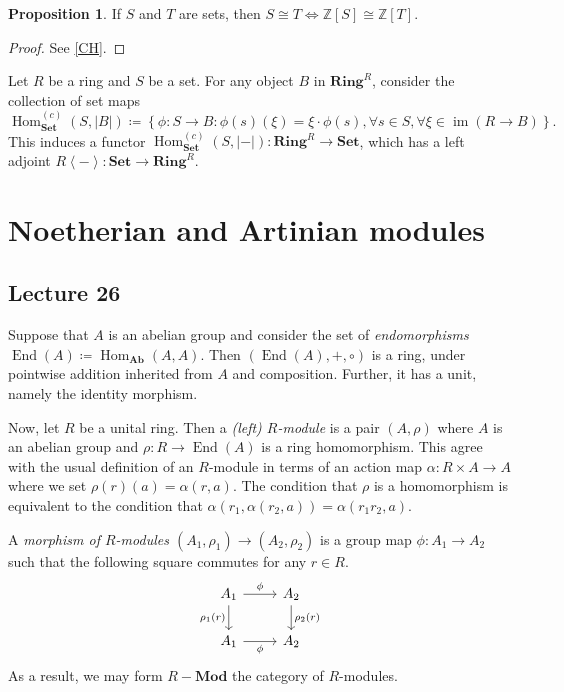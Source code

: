 \documentclass[10pt,letterpaper,cm]{nupset}
\theoremstyle{definition}
\theoremstyle{theorem}
\newtheorem{prop}[definition]{Proposition}
\theoremstyle{remark}
\newcommand{\Z}{\mathbb Z}
\newcommand{\1}{\mathbf{1}}
\newcommand{\0}{\vec 0}
\DeclareMathOperator{\ed}{End}
\DeclareMathOperator{\Hom}{Hom}
\begin{document}
\medskip

\begin{prop}
If $S$ and $T$ are sets, then $S\cong T \iff \Z\left[S\right]\cong \Z\left[T\right]$.
\end{prop}
\begin{proof}
See \cref{CH}.
\end{proof}

\bigskip

Let $R$ be a ring and $S$ be a set. For any object $B$ in $\mathbf{Ring}^R$, consider the collection of set maps
\[
\operatorname{Hom}_{\mathbf{Set}}^{(c)}(S,\left\lvert{B}\right\rvert)\coloneqq \left\{\phi: S \rightarrow B: \phi(s)(\xi)=\xi \cdot \phi(s), \forall{s} \in S, \forall{\xi} \in \operatorname{im}(R \rightarrow B)\right\}. 
\]
This induces a functor $\operatorname{Hom}_{\mathbf{Set}}^{(c)}(S,\left\lvert{-}\right\rvert) : \mathbf{Ring}^R \to \mathbf{Set}$, which has a left adjoint $R\left\langle{-}\right\rangle : \mathbf{Set} \to \mathbf{Ring}^R$.


\section{Noetherian and Artinian modules}

\subsection{Lecture 26}


Suppose that $A$ is an abelian group and consider the set of \textit{endomorphisms} $\ed(A) \coloneqq \Hom_{\mathbf{Ab}}(A, A)$. Then $\left(\ed(A), +, \circ\right)$ is a ring, under pointwise addition inherited from $A$ and composition. Further, it has a unit, namely the identity morphism. 

 Now,
let $R$ be a unital ring. Then a \textit{(left) $R$-module} is a pair $\left(A, \rho\right)$ where $A$ is an abelian group and $\rho : R \to \ed(A)$ is a ring homomorphism.
This agree with the usual definition of an $R$-module in terms of an action map $\alpha : R\times A \to A$ where we set $\rho(r)(a) = \alpha(r, a)$. The condition that $\rho$ is a homomorphism is equivalent to the condition that $\alpha\left(r_{1}, \alpha\left(r_{2}, a\right)\right)=\alpha\left(r_{1} r_{2}, a\right)$. 

A \textit{morphism of $R$-modules $\left(A_1, \rho_1\right) \to \left(A_2, \rho_2\right)$} is a group map $\phi : A_1 \to A_2$ such that the following square commutes for any $r\in R$.
\[
\begin{tikzcd}
A_1 \arrow[d, "\rho_1(r)"'] \arrow[r, "\phi"] & A_2 \arrow[d, "\rho_2(r)"] \\
A_1 \arrow[r, "\phi"'] & A_2
\end{tikzcd}
\] 
As a result, we may form $R{-}\mathbf{Mod}$ the category of $R$-modules.
\end{document}
